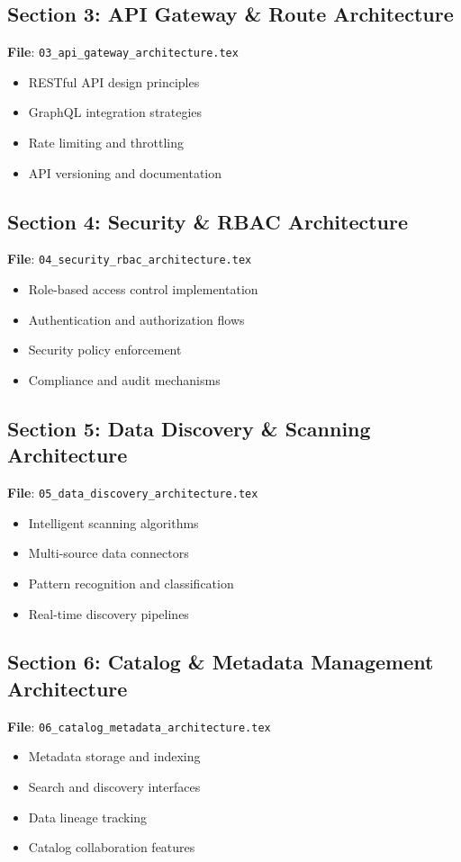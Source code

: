\documentclass[12pt,a4paper]{article}
\begin{document}
\subsection{Section 3: API Gateway \& Route Architecture}
\textbf{File}: \texttt{03\_api\_gateway\_architecture.tex}
\begin{itemize}
    \item RESTful API design principles
    \item GraphQL integration strategies
    \item Rate limiting and throttling
    \item API versioning and documentation
\end{itemize}

\subsection{Section 4: Security \& RBAC Architecture}
\textbf{File}: \texttt{04\_security\_rbac\_architecture.tex}
\begin{itemize}
    \item Role-based access control implementation
    \item Authentication and authorization flows
    \item Security policy enforcement
    \item Compliance and audit mechanisms
\end{itemize}

\subsection{Section 5: Data Discovery \& Scanning Architecture}
\textbf{File}: \texttt{05\_data\_discovery\_architecture.tex}
\begin{itemize}
    \item Intelligent scanning algorithms
    \item Multi-source data connectors
    \item Pattern recognition and classification
    \item Real-time discovery pipelines
\end{itemize}

\subsection{Section 6: Catalog \& Metadata Management Architecture}
\textbf{File}: \texttt{06\_catalog\_metadata\_architecture.tex}
\begin{itemize}
    \item Metadata storage and indexing
    \item Search and discovery interfaces
    \item Data lineage tracking
    \item Catalog collaboration features
\end{itemize}
\end{document}
